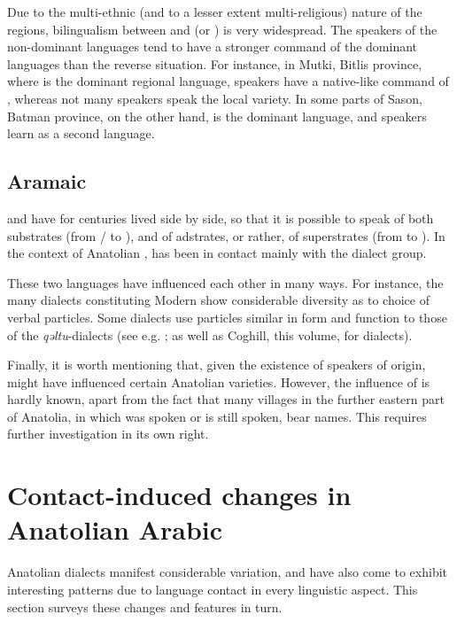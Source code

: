 \documentclass[output=paper]{langsci/langscibook}
\begin{document}
Due to the multi-ethnic (and to a lesser extent multi-religious) nature of the regions, {bilingualism} between  and  (or ) is very widespread. The speakers of the non-dominant languages tend to have a stronger command of the dominant languages than the reverse situation. For instance, in Mutki, Bitlis province, where  is the dominant regional language,  speakers have a native-like command of , whereas not many  speakers speak the local  variety. In some parts of Sason, Batman province, on the other hand,  is the dominant language, and  speakers learn  as a second language.

\subsection{Aramaic}
 and  have for centuries lived side by side, so that it is possible to speak of both substrates (from / to ), and of adstrates, or rather, of superstrates (from  to ). In the context of Anatolian ,  has been in contact mainly with the  dialect group.


These two languages have influenced each other in many ways. For instance, the many dialects constituting Modern  show considerable diversity as to choice of verbal particles. Some dialects use particles similar in form and function to those of the \textit{qəltu}-dialects (see e.g. \citealt{Jastrow1985}; as well as Coghill, this volume, for  dialects).

Finally, it is worth mentioning that, given the existence of  speakers of  origin,  might have influenced certain Anatolian  varieties. However, the influence of  is hardly known, apart from the fact that many villages in the further eastern part of {Anatolia}, in which  was spoken or is still spoken, bear  names. This requires further investigation in its own right.

\section{Contact-induced changes in Anatolian Arabic}

Anatolian  dialects manifest considerable variation, and have also come to exhibit interesting patterns due to language contact in every linguistic aspect. This section surveys these changes and features in turn.
\end{document}
